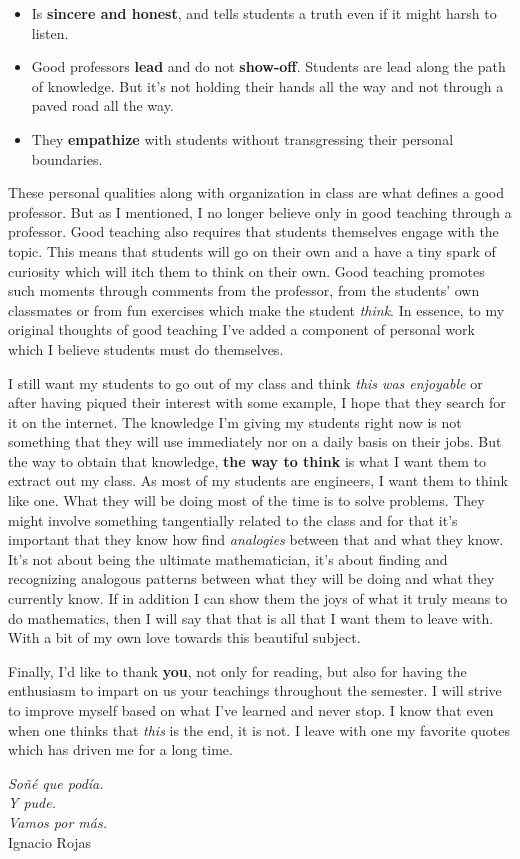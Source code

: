 \documentclass[a4paper,12pt,final]{book}
\begin{document}
\begin{itemize}
    \itemsep=-0.5em
    \item Is \textbf{sincere and honest}, and tells students a truth even if it might harsh to listen. 
    \item Good professors \textbf{lead} and do not \textbf{show-off}. Students are lead along the path of knowledge. But it's not holding their hands all the way and not through a paved road all the way. 
    \item They \textbf{empathize} with students without transgressing their personal boundaries. 
\end{itemize}
These personal qualities along with organization in class are what defines a good professor. But as I mentioned, I no longer believe only in good teaching through a professor. Good teaching also requires that students themselves engage with the topic. This means that students will go on their own and a have a tiny spark of curiosity which will itch them to think on their own. Good teaching promotes such moments through comments from the professor, from the students' own classmates or from fun exercises which make the student \emph{think}. In essence, to my original thoughts of good teaching I've added a component of personal work which I believe students must do themselves.\par 
I still want my students to go out of my class and think \emph{this was enjoyable} or after having piqued their interest with some example, I hope that they search for it on the internet. The knowledge I'm giving my students right now is not something that they will use immediately nor on a daily basis on their jobs. But the way to obtain that knowledge, \textbf{the way to think} is what I want them to extract out my class. As most of my students are engineers, I want them to think like one. What they will be doing most of the time is to solve problems. They might involve something tangentially related to the class and for that it's important that they know how find \emph{analogies} between that and what they know. It's not about being the ultimate mathematician, it's about finding and recognizing analogous patterns between what they will be doing and what they currently know. If in addition I can show them the joys of what it truly means to do mathematics, then I will say that that is all that I want them to leave with. With a bit of my own love towards this beautiful subject.\par 
Finally, I'd like to thank \textbf{you}, not only for reading, but also for having the enthusiasm to impart on us your teachings throughout the semester. I will strive to improve myself based on what I've learned and never stop. I know that even when one thinks that \emph{this} is the end, it is not. I leave with one my favorite quotes which has driven me for a long time. 

\begin{flushright}
    \emph{So\~n\'e que pod\'ia.}\\
    \emph{Y pude.}\\
    \emph{Vamos por m\'as.}\\
    Ignacio Rojas
\end{flushright}
\end{document}
